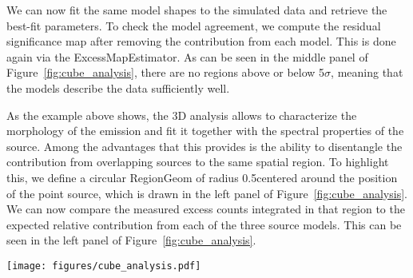 We can now fit the same model shapes to the simulated data and retrieve the best-fit parameters. To check the model agreement, we compute the residual significance map after removing the contribution from each model. This is done again via the ExcessMapEstimator. As can be seen in the middle panel of Figure~\ref{fig:cube_analysis}, there are no regions above or below 5$\sigma$, meaning that the models describe the data sufficiently well.

As the example above shows, the 3D analysis allows to characterize the morphology of the emission and fit it together with the spectral properties of the source.  Among the advantages that this provides is the ability to disentangle the contribution from overlapping sources to the same spatial region. To highlight this, we define a circular RegionGeom of radius 0.5\textdegree centered around the position of the point source, which is drawn in the left panel of Figure~\ref{fig:cube_analysis}. We can now compare the measured excess counts integrated in that region to the expected relative contribution from each of the three source models. This can be seen in the left panel of Figure~\ref{fig:cube_analysis}.

\begin{figure*}[t]
	\centering
	\texttt{[image: figures/cube\_analysis.pdf]}
	\caption{Example 3D analysis for simulated sources using the \cta \irfs. The left image shows a significance map where the three simulated sources can be seen. The middle figure shows another significance map, but this time after subtracting the best-fit model for each of the sources, which are displayed in black. The right figure shows the contribution of each source model to the circular region of radius 0.5\textdegree drawn in the left image, together with the excess counts inside that region.
	}
	\label{fig:cube_analysis}
\end{figure*}

%

